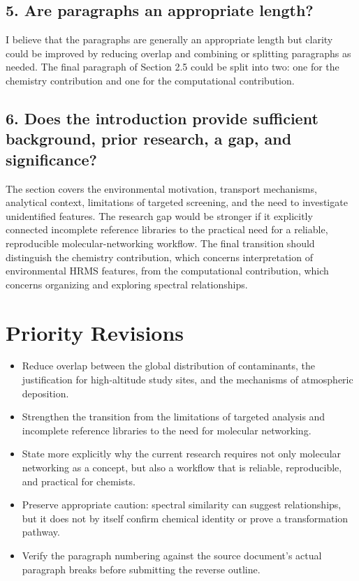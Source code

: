 \documentclass[11pt]{article}
\begin{document}
\begin{doublespace}
    \subsection*{5. Are paragraphs an appropriate length?}
        I believe that the paragraphs are generally an appropriate length but clarity could be improved by reducing overlap and combining or splitting paragraphs as needed. The final paragraph of Section 2.5 could be split into two: one for the chemistry contribution and one for the computational contribution.

    \subsection*{6. Does the introduction provide sufficient background, prior research, a gap, and significance?}
        The section covers the environmental motivation, transport mechanisms, analytical context, limitations of targeted screening, and the need to investigate unidentified features. The research gap would be stronger if it explicitly connected incomplete reference libraries to the practical need for a reliable, reproducible molecular-networking workflow. The final transition should distinguish the chemistry contribution, which concerns interpretation of environmental HRMS features, from the computational contribution, which concerns organizing and exploring spectral relationships.

\section{Priority Revisions}
    \begin{itemize}[leftmargin=*]
        \item Reduce overlap between the global distribution of contaminants, the justification for high-altitude study sites, and the mechanisms of atmospheric deposition.
        \item Strengthen the transition from the limitations of targeted analysis and incomplete reference libraries to the need for molecular networking.
        \item State more explicitly why the current research requires not only molecular networking as a concept, but also a workflow that is reliable, reproducible, and practical for chemists.
        \item Preserve appropriate caution: spectral similarity can suggest relationships, but it does not by itself confirm chemical identity or prove a transformation pathway.
        \item Verify the paragraph numbering against the source document's actual paragraph breaks before submitting the reverse outline.
    \end{itemize}

\end{doublespace}

\newpage

\end{document}
